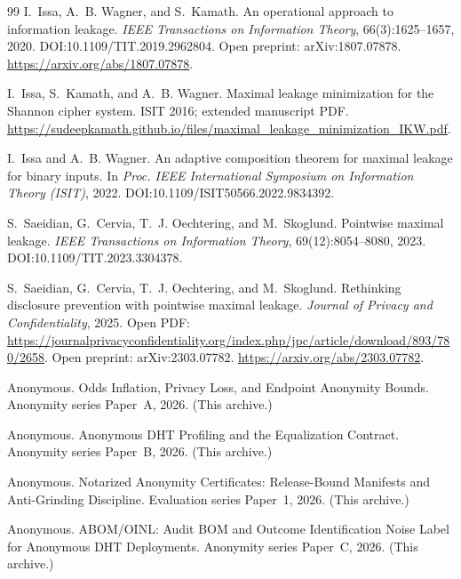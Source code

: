 \documentclass[11pt]{article}
\begin{document}
\begin{thebibliography}{99}
I.~Issa, A.~B. Wagner, and S.~Kamath.
\newblock An operational approach to information leakage.
\newblock \emph{IEEE Transactions on Information Theory}, 66(3):1625--1657, 2020.
\newblock DOI:10.1109/TIT.2019.2962804.
\newblock Open preprint: arXiv:1807.07878. \url{https://arxiv.org/abs/1807.07878}.

I.~Issa, S.~Kamath, and A.~B. Wagner.
\newblock Maximal leakage minimization for the Shannon cipher system.
\newblock ISIT 2016; extended manuscript PDF. \url{https://sudeepkamath.github.io/files/maximal_leakage_minimization_IKW.pdf}.

I.~Issa and A.~B. Wagner.
\newblock An adaptive composition theorem for maximal leakage for binary inputs.
\newblock In \emph{Proc. IEEE International Symposium on Information Theory (ISIT)}, 2022.
\newblock DOI:10.1109/ISIT50566.2022.9834392.

S.~Saeidian, G.~Cervia, T.~J. Oechtering, and M.~Skoglund.
\newblock Pointwise maximal leakage.
\newblock \emph{IEEE Transactions on Information Theory}, 69(12):8054--8080, 2023.
\newblock DOI:10.1109/TIT.2023.3304378.

S.~Saeidian, G.~Cervia, T.~J. Oechtering, and M.~Skoglund.
\newblock Rethinking disclosure prevention with pointwise maximal leakage.
\newblock \emph{Journal of Privacy and Confidentiality}, 2025.
\newblock Open PDF: \url{https://journalprivacyconfidentiality.org/index.php/jpc/article/download/893/780/2658}.
\newblock Open preprint: arXiv:2303.07782. \url{https://arxiv.org/abs/2303.07782}.

Anonymous.
\newblock Odds Inflation, Privacy Loss, and Endpoint Anonymity Bounds.
\newblock Anonymity series Paper~A, 2026. (This archive.)

Anonymous.
\newblock Anonymous DHT Profiling and the Equalization Contract.
\newblock Anonymity series Paper~B, 2026. (This archive.)

Anonymous.
\newblock Notarized Anonymity Certificates: Release-Bound Manifests and Anti-Grinding Discipline.
\newblock Evaluation series Paper~1, 2026. (This archive.)

Anonymous.
\newblock ABOM/OINL: Audit BOM and Outcome Identification Noise Label for Anonymous DHT Deployments.
\newblock Anonymity series Paper~C, 2026. (This archive.)


\end{thebibliography}
\end{document}
